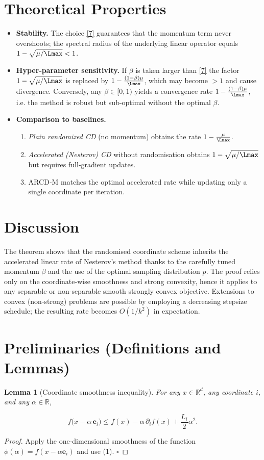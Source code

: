 \documentclass{article}
\newtheorem{lemma}{Lemma}
\newcommand{\R}{\mathbb{R}}
\newcommand{\be}{\mathbf{e}}
\begin{document}
\section*{Theoretical Properties}
\begin{itemize}[leftmargin=*]
\item \textbf{Stability.} The choice \eqref{7} guarantees that the
momentum term never overshoots; the spectral radius of the underlying
linear operator equals $1-\sqrt{\mu/\Lmax}<1$.
\item \textbf{Hyper‑parameter sensitivity.} If $\beta$ is taken larger
than \eqref{7} the factor $1-\sqrt{\mu/\Lmax}$ is replaced by
$1-\frac{(1-\beta)\mu}{\Lmax}$, which may become $>1$ and cause divergence.
Conversely, any $\beta\in[0,1)$ yields a convergence rate
$1-\frac{(1-\beta)\mu}{\Lmax}$, i.e. the method is robust but
sub‑optimal without the optimal $\beta$.
\item \textbf{Comparison to baselines.}
\begin{enumerate}
\item \emph{Plain randomized CD} (no momentum) obtains the rate
$1-\frac{\mu}{\Lmax}$.
\item \emph{Accelerated (Nesterov) CD} without randomisation obtains
$1-\sqrt{\mu/\Lmax}$ but requires full‑gradient updates.
\item ARCD‑M matches the optimal accelerated rate while updating only a
single coordinate per iteration.
\end{enumerate}
\end{itemize}

\section*{Discussion}
The theorem shows that the randomised coordinate scheme inherits the
accelerated linear rate of Nesterov’s method thanks to the carefully tuned
momentum $\beta$ and the use of the optimal sampling distribution $p$.
The proof relies only on the coordinate‑wise smoothness and strong convexity,
hence it applies to any separable or non‑separable smooth strongly convex
objective.  Extensions to convex (non‑strong) problems are possible by
employing a decreasing stepsize schedule; the resulting rate becomes
$O(1/k^{2})$ in expectation.

\section*{Preliminaries (Definitions and Lemmas)}
\begin{lemma}[Coordinate smoothness inequality]\label{lem:smooth}
For any $x\in\R^{d}$, any coordinate $i$, and any $\alpha\in\R$,

\[
f\bigl(x-\alpha\,\be_{i}\bigr)\le
f(x)-\alpha\,\partial_{i}f(x)+\frac{L_{i}}{2}\alpha^{2}.
\tag{9}
\]
\end{lemma}
\begin{proof}
Apply the one‑dimensional smoothness of the function
$\phi(\alpha)=f(x-\alpha\be_{i})$ and use (1). $\square$
\end{proof}
\end{document}
